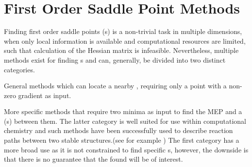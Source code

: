 \chapter{First Order Saddle Point Methods}
\label{chap:saddle-point-methods}

Finding first order saddle points (s) is a non-trivial task in multiple dimensions, when only local information is available and computational resources are limited, such that calculation of the Hessian matrix is infeasible.
Nevertheless, multiple methods exist for finding s and can, generally, be divided into two distinct categories.
\item General methods which can locate a nearby , requiring only a point with a non-zero gradient as input.
\item More specific methods that require two minima as input to find the MEP and a  (s) between them.
\een
The latter category is well suited for use within computational chemistry and such methods have been successfully used to describe reaction paths between two stable structures.(see for example \citemiss)
The first category has a more broad use as it is not constrained to find specific s, however, the downside is that there is no guarantee that the found  will be of interest.

\expand {}




